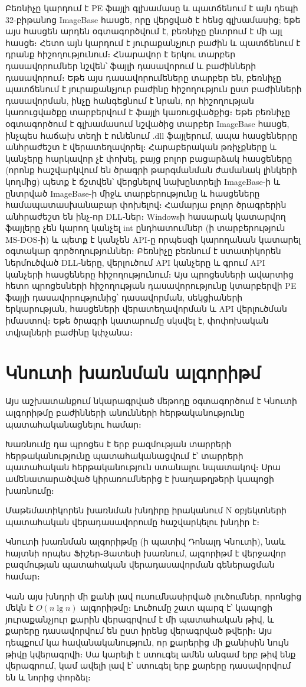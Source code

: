 \documentclass[12pt]{article}
\begin{document}
\begin{sloppypar}
Բեռնիչը կարդում է PE ֆայլի
գլխամասը և պատճենում է այն դեպի 32-բիթանոց ImageBase հասցե, որը վերցված է հենց
գլխամասից; եթե այս հասցեն արդեն օգտագործվում է, բեռնիչը ընտրում է մի այլ
հասցե։ Հետո այն կարդում է յուրաքանչյուր բաժին և պատճենում է դրանք
հիշողությունում։ Հնարավոր է երկու տարբեր դասավորումներ նշվեն՝ ֆայլի դասավորում
և բաժինների դասավորում։ Եթե այս դասավորումեները տարբեր են, բեռնիչը պատճենում
է յուրաքանչյուր բաժինը հիշողություն ըստ բաժինների դասավորման, ինչը
հանգեցնում է նրան, որ հիշողության կառուցվածքը տարբերվում է ֆայլի կառուցվածքից։
Եթե բեռնիչը օգտագործում է գլխամասում նշվածից տարբեր ImageBase հասցե, ինչպես
հաճախ տեղի է ունենում .dll ֆայլերում, ապա հասցեներրը անհրաժեշտ է
վերատեղավորել։ Հարաբերական թռիչքները և կանչերը հարկավոր չէ փոխել, բայց բոլոր
բացարձակ հասցեները (որոնք հաշվարկվում են ծրագրի թարգմանման ժամանակ լինկերի
կողմից) պետք է ճշտվեն՝ վերցնելով նախընտրելի ImageBase-ի և ընտրված ImageBase-ի
միջև տարբերությունը և հասցեները համապատասխանաբար փոխելով։ Համարյա բոլոր
ծրագրերին անհրաժեշտ են ինչ֊որ DLL֊ներ։ Windowsի հասարակ կատարվող ֆայլերը
չեն կարող կանչել int ընդհատումներ (ի տարբերություն MS-DOS֊ի) և պետք է
կանչեն API֊ը որպեսզի կարողանան կատարել օգտակար գործողություններ։
Բեռնիչը բեռնում է ստատիկորեն ներմուծված DLL֊ները, վերլուծում API կանչերը
և գրում API կանչերի հասցեները հիշողությունում։ Այս պրոցեսների ավարտից
հետո պրոցեսների հիշողության դասավորությունը կտարբերվի PE ֆայլի
դասավորությունից՝ դասավորման, սեկցիաների երկարության, հասցեների վերատեղավորման
և API վերլուծման իմաստով։ Եթե ծրագրի կատարումը սկսվել է, փոփոխական տվյալների
բաժինը կփչանա։

\section{Կնուտի խառնման ալգորիթմ}
Այս աշխատանքում նկարագրված մեթոդը օգտագործում է Կնուտի ալգորիթմը
բաժինների անունների հերթականությունը պատահականացնելու համար։

Խառնումը դա պրոցես է երբ բազմության տարրերի հերթականությունը պատահականացվում
է՝ տարրերի պատահական հերթականություն ստանալու նպատակով։ Սրա ամենատարածված
կիրառումներից է խաղաթղթերի կապոցի խառնումը։

Մաթեմատիկորեն խառնման խնդիրը իրականում N օբյեկտների պատահական
վերադասավորումը հաշվարկելու խնդիր է։

Կնուտի խառնման ալգորիթմը (ի պատիվ Դոնալդ Կնուտի), նաև հայտնի որպես
Ֆիշեր֊Յատեսի խառնում, ալգորիթմ է վերջավոր բազմության պատահական վերադասավորման
գեներացման համար։

Կան այս խնդրի մի քանի լավ ուսումնասիրված լուծումներ, որոնցից մեկն է
$O(n\lg n)$ ալգորիթմը։ Լուծումը շատ պարզ է՝ կապոցի յուրաքանչյուր քարին
վերագրվում է մի պատահական թիվ, և քարերը դասավորվում են ըստ իրենց վերագրված
թվերի։ Այս դեպքում կա հավանականություն, որ քարերից մի քանիսին նույն թիվը
կվերագրվի։ Սա կարելի է ստուգել ամեն անգամ երբ թիվ ենք վերագրում, կամ
ավելի լավ է՝ ստուգել երբ քարերը դասավորվում են և նորից փորձել։


\end{sloppypar}
\end{document}
